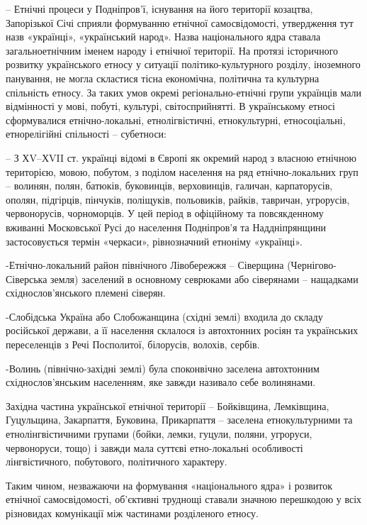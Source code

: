 \begin{itemize}
– Етнічні процеси у Подніпров’ї, існування на його території козацтва,
Запорізької Січі сприяли формуванню етнічної самосвідомості, утвердження тут
назв «українці», «український народ». Назва національного ядра ставала
загальноетнічним іменем народу і етнічної території. На протязі історичного
розвитку українського етносу у ситуації політико-культурного розділу,
іноземного панування, не могла скластися тісна економічна, політична та
культурна спільність етносу. За таких умов окремі регіонально-етнічні групи
українців мали відмінності у мові, побуті, культурі, світосприйнятті. В
українському етносі сформувалися етнічно-локальні, етнолігвістичні,
етнокультурні, етносоціальні, етнорелігійні спільності – субетноси:

– З ХV–ХVII ст. українці відомі в Європі як окремий народ з власною етнічною
територією, мовою, побутом, з поділом населення на ряд етнічно-локальних груп –
волинян, полян, батюків, буковинців, верховинців, галичан, карпаторусів,
ополян, підгірців, пінчуків, поліщуків, польовиків, райків, тавричан,
угрорусів, червонорусів, чорноморців. У цей період в офіційному та
повсякденному вживанні Московської Русі до населення Подніпров’я та
Наддніпрянщини застосовується термін «черкаси», рівнозначний етноніму
«українці».

-Етнічно-локальний район північного Лівобережжя – Сіверщина
(Чернігово-Сіверська земля) заселений в основному севрюками або сіверянами –
нащадками східнослов’янського племені сіверян.

-Слобідська Україна або Слобожанщина (східні землі) входила до складу
російської держави, а її населення склалося із автохтонних росіян та
українських переселенців з Речі Посполитої, білорусів, волохів, сербів.

-Волинь (північно-західні землі) була споконвічно заселена автохтонним
східнослов’янським населенням, яке завжди називало себе волинянами.

Західна частина української етнічної території – Бойківщина, Лемківщина,
Гуцульщина, Закарпаття, Буковина, Прикарпаття – заселена етнокультурними та
етнолінгвістичними групами (бойки, лемки, гуцули, поляни, угроруси,
червоноруси, тощо) і завжди мала суттєві етно-локальні особливості
лінгвістичного, побутового, політичного характеру.

Таким чином, незважаючи на формування «національного ядра» і розвиток етнічної
самосвідомості, об’єктивні труднощі ставали значною перешкодою у всіх
різновидах комунікації між частинами розділеного етносу.


\end{itemize}
